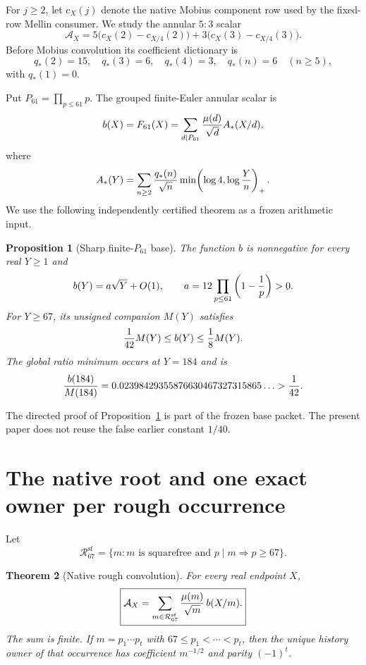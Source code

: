 \documentclass[11pt]{article}
\newtheorem{theorem}{Theorem}[section]
\newtheorem{proposition}[theorem]{Proposition}
\newcommand{\Acal}{\mathcal A}
\newcommand{\Rcal}{\mathcal R}
\begin{document}
For $j\ge2$, let $c_X(j)$ denote the native Mobius component row used by the
fixed-row Mellin consumer.  We study the annular $5{:}3$ scalar
\begin{equation}\label{eq:native-scalar}
 \Acal_X
 =5\bigl(c_X(2)-c_{X/4}(2)\bigr)
 +3\bigl(c_X(3)-c_{X/4}(3)\bigr).
\end{equation}
Before Mobius convolution its coefficient dictionary is
\begin{equation}\label{eq:qstar}
 q_*(2)=15,\quad q_*(3)=6,\quad q_*(4)=3,
 \quad q_*(n)=6\quad(n\ge5),
\end{equation}
with $q_*(1)=0$.

Put $P_{61}=\prod_{p\le61}p$.  The grouped finite-Euler annular scalar is
\begin{equation}\label{eq:bdef}
 b(X)=F_{61}(X)
 =\sum_{d\mid P_{61}}{\mu(d)\over\sqrt d}A_*(X/d),
\end{equation}
where
\[
 A_*(Y)=\sum_{n\ge2}{q_*(n)\over\sqrt n}
        \min\!\left(\log4,\log{Y\over n}\right)_+.
\]
We use the following independently certified theorem as a frozen arithmetic
input.

\begin{proposition}[Sharp finite-$P_{61}$ base]\label{prop:base}
The function $b$ is nonnegative for every real $Y\ge1$ and
\[
 b(Y)=a\sqrt Y+O(1),
 \qquad
 a=12\prod_{p\le61}\left(1-{1\over p}\right)>0.
\]
For $Y\ge67$, its unsigned companion $M(Y)$ satisfies
\[
 {1\over42}M(Y)\le b(Y)\le {1\over8}M(Y).
\]
The global ratio minimum occurs at $Y=184$ and is
\[
 {b(184)\over M(184)}
 =0.02398429355876630467327315865\ldots>{1\over42}.
\]
\end{proposition}

The directed proof of Proposition~\ref{prop:base} is part of the frozen base
packet.  The present paper does not reuse the false earlier constant $1/40$.

\section{The native root and one exact owner per rough occurrence}

Let
\[
 \Rcal_{67}^{\mathrm{sf}}
 =\{m:m\text{ is squarefree and }p\mid m\Rightarrow p\ge67\}.
\]

\begin{theorem}[Native rough convolution]\label{thm:native-root}
For every real endpoint $X$,
\begin{equation}\label{eq:root-convolution}
 \boxed{
 \Acal_X=\sum_{m\in\Rcal_{67}^{\mathrm{sf}}}
 {\mu(m)\over\sqrt m}\,b(X/m).
 }
\end{equation}
The sum is finite.  If $m=p_1\cdots p_t$ with
$67\le p_1<\cdots<p_t$, then the unique history owner of that occurrence has
coefficient $m^{-1/2}$ and parity $(-1)^t$.
\end{theorem}
\end{document}
